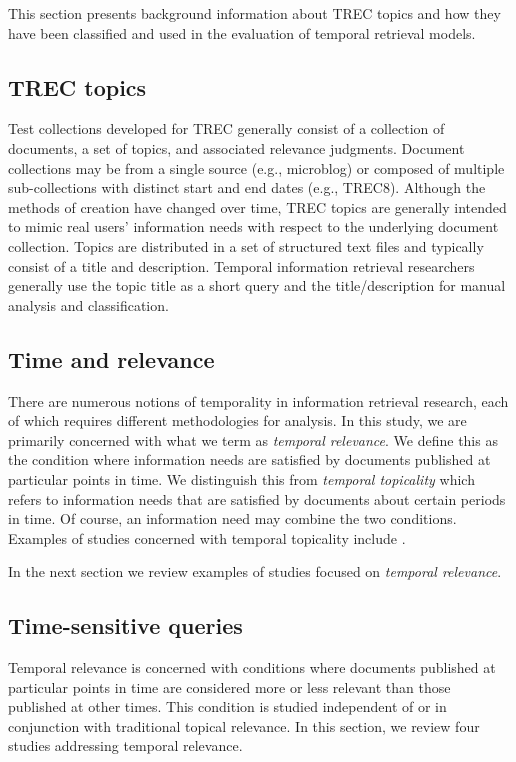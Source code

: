 \documentclass[runningheads,a4paper]{llncs}
\begin{document}
This section presents background information about TREC topics and how they have been classified and used in the evaluation of temporal retrieval models.

\subsection{TREC topics}

Test collections developed for TREC generally consist of a collection of documents, a set of topics, and associated relevance judgments. Document collections may be from a single source (e.g., microblog) or composed of multiple sub-collections with distinct start and end dates (e.g., TREC8).  Although the methods of creation have changed over time, TREC topics are generally intended to mimic real users' information needs with respect to the underlying document collection. Topics are distributed in a set of structured text files and typically consist of a title and description.  Temporal information retrieval researchers generally use the topic title as a short query and the title/description for manual analysis and classification.

\subsection{Time and relevance}

There are numerous notions of temporality in information retrieval research, each of which requires different methodologies for analysis. In this study, we are primarily concerned with what we term as \emph{temporal relevance}. We define this as the condition where information needs are satisfied by documents published at particular points in time. We distinguish this from \emph{temporal topicality} which refers to information needs that are satisfied by documents about certain periods in time. Of course, an information need may combine the two conditions. Examples of studies concerned with temporal topicality include \cite{Berberich2010,Kanhabua2011}.

In the next section we review examples of studies focused on  \emph{temporal relevance}.

\subsection{Time-sensitive queries}
Temporal relevance is concerned with conditions where documents published at particular points in time are considered more or less relevant than those published at other times. This condition is studied independent of or in conjunction with traditional topical relevance. In this section, we review four studies addressing temporal relevance.
\end{document}

